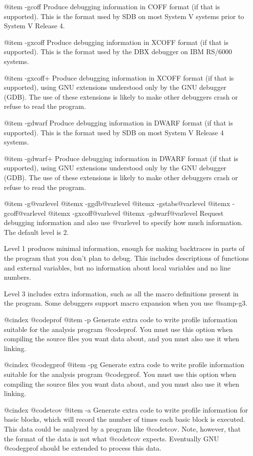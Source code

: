 {@item -gcoff
Produce debugging information in COFF format (if that is supported).
This is the format used by SDB on most System V systems prior to
System V Release 4.

@item -gxcoff
Produce debugging information in XCOFF format (if that is supported).
This is the format used by the DBX debugger on IBM RS/6000 systems.

@item -gxcoff+
Produce debugging information in XCOFF format (if that is supported),
using GNU extensions understood only by the GNU debugger (GDB).  The
use of these extensions is likely to make other debuggers crash or
refuse to read the program.

@item -gdwarf
Produce debugging information in DWARF format (if that is supported).
This is the format used by SDB on most System V Release 4 systems.

@item -gdwarf+
Produce debugging information in DWARF format (if that is supported),
using GNU extensions understood only by the GNU debugger (GDB).  The
use of these extensions is likely to make other debuggers crash or
refuse to read the program.

@item -g@var{level}
@itemx -ggdb@var{level}
@itemx -gstabs@var{level}
@itemx -gcoff@var{level}
@itemx -gxcoff@var{level}
@itemx -gdwarf@var{level}
Request debugging information and also use @var{level} to specify how
much information.  The default level is 2.

Level 1 produces minimal information, enough for making backtraces in
parts of the program that you don't plan to debug.  This includes
descriptions of functions and external variables, but no information
about local variables and no line numbers.

Level 3 includes extra information, such as all the macro definitions
present in the program.  Some debuggers support macro expansion when
you use @samp{-g3}.

@cindex @code{prof}
@item -p
Generate extra code to write profile information suitable for the
analysis program @code{prof}.  You must use this option when compiling
the source files you want data about, and you must also use it when
linking.

@cindex @code{gprof}
@item -pg
Generate extra code to write profile information suitable for the
analysis program @code{gprof}.  You must use this option when compiling
the source files you want data about, and you must also use it when
linking.

@cindex @code{tcov}
@item -a
Generate extra code to write profile information for basic blocks,
which will record the number of times each basic block is executed.
This data could be analyzed by a program like @code{tcov}.  Note,
however, that the format of the data is not what @code{tcov} expects.
Eventually GNU @code{gprof} should be extended to process this data.

}
